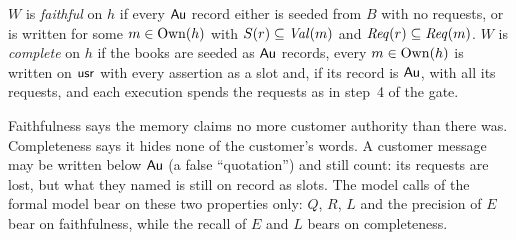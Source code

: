 \begin{definition}\label{def:faithful}
$W$ is \emph{faithful} on $h$ if every $\mathsf{Au}$ record either is seeded from $B$ with no requests, or
is written for some $m \in \mathrm{Own}(h)$ with $S(r) \subseteq \mathit{Val}(m)$ and $\mathit{Req}(r) \subseteq \mathit{Req}(m)$.
$W$ is \emph{complete} on $h$ if the books are seeded as $\mathsf{Au}$ records, every $m \in \mathrm{Own}(h)$ is
written on $\mathsf{usr}$ with every assertion as a slot and, if its record is $\mathsf{Au}$, with all its requests,
and each execution spends the requests as in step~4 of the gate.
\end{definition}

Faithfulness says the memory claims no more customer authority than there was. Completeness
says it hides none of the customer's words. A customer message may be written below $\mathsf{Au}$ (a
false ``quotation'') and still count: its requests are lost, but what they named is still on
record as slots. The model calls of the formal model bear on these
two properties only: $Q$, $R$, $L$ and the precision of $E$ bear on faithfulness, while the
recall of $E$ and $L$ bears on completeness.
